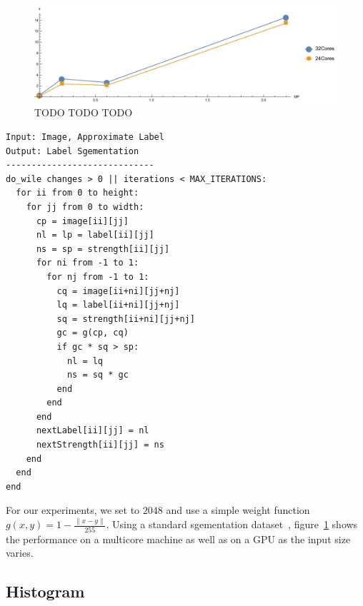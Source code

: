\begin{figure}
\centering
\includegraphics[scale=0.4]{fig/growcut.pdf}
\caption{TODO TODO TODO}
\label{fig:growcut}
\centering
\end{figure}

\begin{lstlisting}
Input: Image, Approximate Label
Output: Label Sgementation
-----------------------------
do_wile changes > 0 || iterations < MAX_ITERATIONS:
  for ii from 0 to height:
    for jj from 0 to width:
      cp = image[ii][jj]
      nl = lp = label[ii][jj]
      ns = sp = strength[ii][jj]
      for ni from -1 to 1:
        for nj from -1 to 1:
          cq = image[ii+ni][jj+nj]
          lq = label[ii+ni][jj+nj]
          sq = strength[ii+ni][jj+nj]
          gc = g(cp, cq)
          if gc * sq > sp:
            nl = lq
            ns = sq * gc
          end
        end
      end
      nextLabel[ii][jj] = nl
      nextStrength[ii][jj] = ns
    end
  end
end
\end{lstlisting}

For our experiments, we set  to $2048$ and use a
  simple weight function $g(x,y)  = 1 - \frac{\|x - y\|}{255}$.
Using a standard sgementation dataset~\cite{gridcut}, figure~\ref{fig:growcut} shows the
  performance on a multicore machine as well as on a GPU as the input
  size varies.

\subsection{Histogram}

